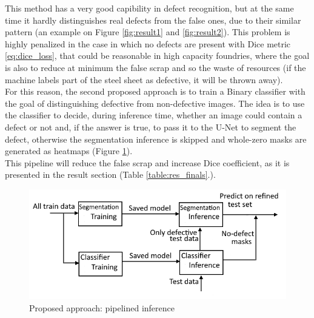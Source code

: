 \documentclass[10pt,twocolumn,letterpaper]{article}
\begin{document}
   This method has a very good capibility in defect recognition, but at the same time it hardly distinguishes real defects from the false ones, due to their similar pattern (an example on Figure \ref{fig:result1} and \ref{fig:result2}). This problem is highly penalized in the case in which no defects are present with Dice metric \eqref{eq:dice_loss}, that could be reasonable in high capacity foundries, where the goal is also to reduce at minimum the false scrap and so the waste of resources (if the machine labels part of the steel sheet as defective, it will be thrown away).\\
   For this reason, the second proposed approach is to train a Binary classifier with the goal of distinguishing defective from non-defective images. The idea is to use the classifier to decide, during inference time, whether an image could contain a defect or not and, if the answer is true, to pass it to the U-Net to segment the defect, otherwise the segmentation inference is skipped and whole-zero masks are generated as heatmaps (Figure \ref{fig:secondApproach}).\\
   This pipeline will reduce the false scrap and increase Dice coefficient, as it is presented in the result section (Table \ref{table:res_finals}.).
    
   \begin{figure}[h]
      \caption{Proposed approach: pipelined inference } \label{fig:secondApproach}
      \includegraphics[scale=0.48]{Img_SecondApproach}
   \end{figure}
\end{document}
